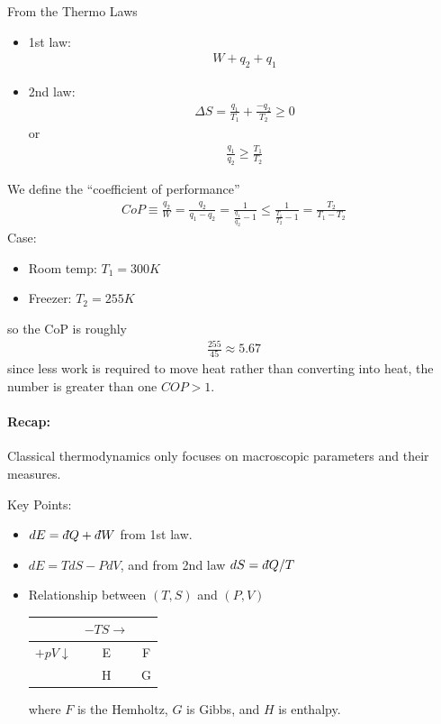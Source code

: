 \documentclass[../main.tex]{subfiles}
\begin{document}
From the Thermo Laws
\begin{itemize}
    \item 1st law:
    \begin{align*}
        W + q_2 + q_1
    \end{align*}
    \item 2nd law:
    \begin{align*}
        \Delta S = \frac{q_1}{T_1} + \frac{-q_2}{T_2} \geq 0
    \end{align*}
    or
    \begin{align*}
        \frac{q_1}{q_2} \geq \frac{T_1}{T_2}
    \end{align*}
\end{itemize}
We define the ``coefficient of performance''
\begin{align*}
    CoP \equiv \frac{q_2}{W} = \frac{q_2}{q_1 - q_2} = \frac{1}{\frac{q_1}{q_2} - 1} \leq \frac{1}{\frac{T_1}{T_2} - 1} = \frac{T_2}{T_1 - T_2}
\end{align*}
Case:
\begin{itemize}
    \item Room temp: $T_1 = 300 K$
    \item Freezer: $T_2 = 255 K$
\end{itemize}
so the CoP is roughly
\begin{align*}
    \frac{255}{45} \approx 5.67
\end{align*}
since less work is required to move heat rather than converting into heat, the number is greater than one $COP > 1$.

\paragraph{Recap:} Classical thermodynamics only focuses on macroscopic parameters and their measures.

Key Points:
\begin{itemize}
    \item $dE = d\hspace*{-0.08em}\bar{}\hspace*{0.1em} Q + d\hspace*{-0.08em}\bar{}\hspace*{0.1em} W$ from 1st law.
    \item $dE = TdS - PdV$, and from 2nd law $dS = d\hspace*{-0.08em}\bar{}\hspace*{0.1em} Q /T$
    \item Relationship between $(T,S)$ and $(P,V)$
    \begin{table}
        \centering
        \begin{tabular}{c|c|c}
            & $-TS \to$ \\
            \hline
            $+pV \downarrow$ & E & F \\
            & H & G
        \end{tabular}
    \end{table}
    where $F$ is the Hemholtz, $G$ is Gibbs, and $H$ is enthalpy.
\end{itemize}
\end{document}
